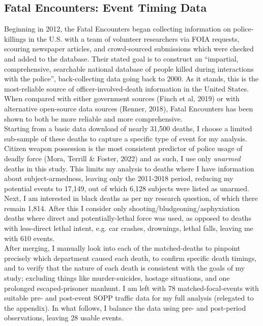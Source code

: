 \subsection{Fatal Encounters: Event Timing Data}
Beginning in 2012, the Fatal Encounters began collecting information on police-killings in the U.S. with a team of volunteer researchers via FOIA requests, scouring newspaper articles, and crowd-sourced submissions which were checked and added to the database. Their stated goal is to construct an ``impartial, comprehensive, searchable national database of people killed during interactions with the police'', back-collecting data going back to 2000. As it stands, this is the most-reliable source of officer-involved-death information in the United States. When compared with either government sources (Finch et al, 2019) or with alternative open-source data sources (Renner, 2018), Fatal Encounters has been shown to both be more reliable and more comprehensive. \\

Starting from a basic data download of nearly 31,500 deaths, I choose a limited sub-sample of these deaths to capture a specific type of event for my analysis. Citizen weapon possession is the most consistent predictor of police usage of deadly force (Mora, Terrill \& Foster, 2022) and as such, I use only \emph{unarmed} deaths in this study. This limits my analysis to deaths where I have information about subject-armedness, leaving only the 2011-2018 period, reducing my potential events to 17,149, out of which 6,128 subjects were listed as unarmed. Next, I am interested in black deaths as per my research question, of which there remain 1,814. After this I consider only shooting/bludgeoning/asphyxiation deaths where direct and potentially-lethal force was used, as opposed to deaths with less-direct lethal intent, e.g. car crashes, drownings, lethal falls, leaving me with 610 events. \\

After merging, I manually look into each of the matched-deaths to pinpoint precisely which department caused each death, to confirm specific death timings, and to verify that the nature of each death is consistent with the goals of my study; excluding things like murder-suicides, hostage situations, and one prolonged escaped-prisoner manhunt. I am left with 78 matched-focal-events with suitable pre- and post-event SOPP traffic data for my full analysis (relegated to the appendix). In what follows, I balance the data using pre- and post-period observations, leaving 28 usable events.  \\

